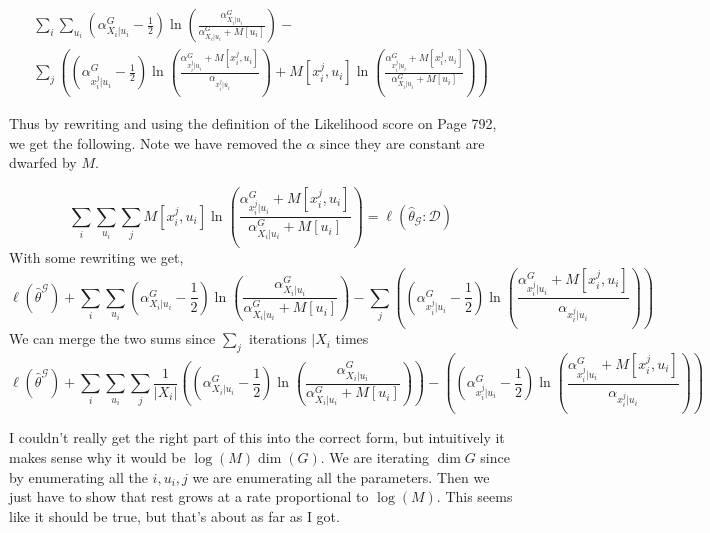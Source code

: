 \documentclass[11pt,a4paper]{article}
\begin{document}
\begin{enumerate}
\begin{multline*}
\sum_i \sum_{u_i} (\alpha_{X_i|u_i}^G - \frac{1}{2}) \ln (\frac{\alpha_{X_i|u_i}^G }{\alpha_{X_i|u_i}^G  + M[u_i]}) - \\ \sum_j \left( (\alpha_{x_i^j|u_i}^G - \frac{1}{2}) \ln(\frac{\alpha_{x_i^j|u_i}^G + M[x_i^j,u_i]}{  \alpha_{x_i^j|u_i}}   ) + M[x_i^j,u_i] \ln(\frac{\alpha_{x_i^j|u_i}^G + M[x_i^j,u_i]}{\alpha_{X_i|u_i}^G  + M[u_i]})  \right)
\end{multline*}

Thus by rewriting and using the definition of the Likelihood score on Page 792, we get the following. Note we have removed the $\alpha$ since they are constant are dwarfed by $M$.

$$
\sum_i \sum_{u_i}\sum_j M[x_i^j,u_i] \ln(\frac{\alpha_{x_i^j|u_i}^G + M[x_i^j,u_i]}{\alpha_{X_i|u_i}^G  + M[u_i]}) = \ell(\hat{\theta}_{\mathcal{G}} : \mathcal{D})
$$
With some rewriting we get,
$$ \ell(\hat{\theta}^\mathcal{G}) + \sum_i \sum_{u_i} (\alpha_{X_i|u_i}^G - \frac{1}{2}) \ln (\frac{\alpha_{X_i|u_i}^G }{\alpha_{X_i|u_i}^G  + M[u_i]}) - \sum_j \left( (\alpha_{x_i^j|u_i}^G - \frac{1}{2}) \ln(\frac{\alpha_{x_i^j|u_i}^G + M[x_i^j,u_i]}{  \alpha_{x_i^j|u_i}} )  \right)$$
We can merge the two sums since $\sum_j$ iterations $|X_i$ times
$$ \ell(\hat{\theta}^\mathcal{G}) + \sum_i \sum_{u_i}\sum_j \frac{1}{|X_i|}\left((\alpha_{X_i|u_i}^G - \frac{1}{2}) \ln (\frac{\alpha_{X_i|u_i}^G }{\alpha_{X_i|u_i}^G  + M[u_i]}) \right) - \left( (\alpha_{x_i^j|u_i}^G - \frac{1}{2}) \ln(\frac{\alpha_{x_i^j|u_i}^G + M[x_i^j,u_i]}{  \alpha_{x_i^j|u_i}} )  \right)$$

I couldn't really get the right part of this into the correct form, but intuitively it makes sense why it would be $\log(M)\dim(G)$. We are iterating $\dim{G}$ since by enumerating all the $i,u_i,j$ we are enumerating all the parameters. Then we just have to show that rest grows at a rate proportional to $\log(M)$.  This seems like it should be true, but that's about as far as I got. 
	\end{enumerate}
	
\end{document}
